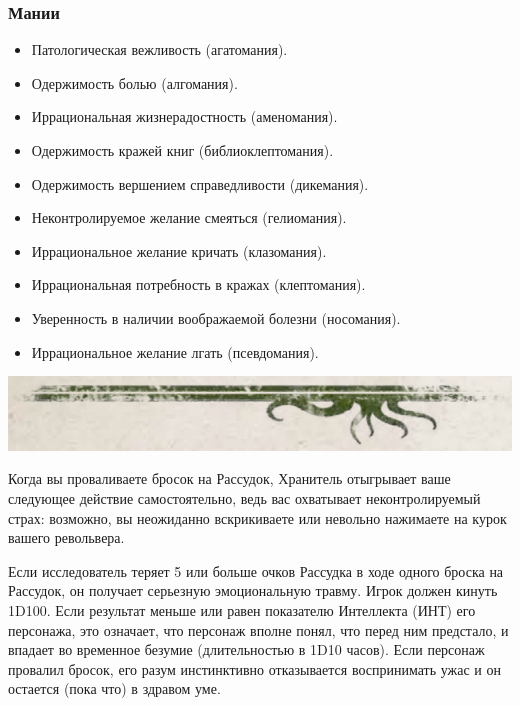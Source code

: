 \documentclass[letterpaper,twocolumn,openany, twoside, 11pt, usenames]{cocbook}
\begin{document}
\begin{fullcocpaperbox}{}{}
\begin{multicols}{2}
  \subsubsection*{Мании}
  \begin{itemize}[leftmargin=4mm]
  \item Патологическая вежливость (агатомания).
  \item Одержимость болью (алгомания).
  \item Иррациональная жизнерадостность (аменомания).
  \item Одержимость кражей книг (библиоклептомания).
  \item Одержимость вершением справедливости (дикемания).
  \item Неконтролируемое желание смеяться (гелиомания).
  \item Иррациональное желание кричать (клазомания).
  \item Иррациональная потребность в кражах (клептомания).
  \item Уверенность в наличии воображаемой болезни (носомания).
  \item Иррациональное желание лгать (псевдомания).
\end{itemize}
  \end{multicols}
  \includegraphics[width=\linewidth]{img/bottom.png}
\end{fullcocpaperbox}

Когда вы проваливаете бросок на Рассудок, Хранитель отыгрывает ваше следующее действие самостоятельно, ведь вас охватывает неконтролируемый страх: возможно, вы неожиданно вскрикиваете или невольно нажимаете на курок вашего револьвера.

Если исследователь теряет 5 или больше очков Рассудка в ходе одного броска на Рассудок, он получает серьезную эмоциональную травму. Игрок должен кинуть 1D100. Если результат меньше или равен показателю Интеллекта (ИНТ) его персонажа, это означает, что персонаж вполне понял, что перед ним предстало, и впадает во временное безумие (длительностью в  1D10 часов). Если персонаж провалил бросок, его разум инстинктивно отказывается воспринимать ужас и он остается (пока что) в здравом уме.
\end{document}
